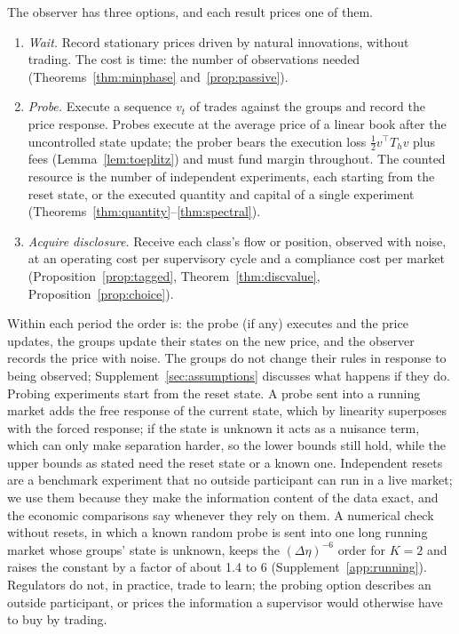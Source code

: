 \documentclass[12pt]{article}
\theoremstyle{definition}
\theoremstyle{remark}
\begin{document}
The observer has three options, and each result prices one of them.
\begin{enumerate}[label=(\alph*),itemsep=1pt]
\item \emph{Wait.} Record stationary prices driven by natural innovations, without trading. The cost is time: the number of observations needed (Theorems~\ref{thm:minphase} and~\ref{prop:passive}).
\item \emph{Probe.} Execute a sequence $v_t$ of trades against the groups and record the price response. Probes execute at the average price of a linear book after the uncontrolled state update; the prober bears the execution loss $\tfrac12v^\top T_hv$ plus fees (Lemma~\ref{lem:toeplitz}) and must fund margin throughout. The counted resource is the number of independent experiments, each starting from the reset state, or the executed quantity and capital of a single experiment (Theorems~\ref{thm:quantity}--\ref{thm:spectral}).
\item \emph{Acquire disclosure.} Receive each class's flow or position, observed with noise, at an operating cost per supervisory cycle and a compliance cost per market (Proposition~\ref{prop:tagged}, Theorem~\ref{thm:discvalue}, Proposition~\ref{prop:choice}).
\end{enumerate}
Within each period the order is: the probe (if any) executes and the price updates, the groups update their states on the new price, and the observer records the price with noise. The groups do not change their rules in response to being observed; Supplement~\ref{sec:assumptions} discusses what happens if they do. Probing experiments start from the reset state. A probe sent into a running market adds the free response of the current state, which by linearity superposes with the forced response; if the state is unknown it acts as a nuisance term, which can only make separation harder, so the lower bounds still hold, while the upper bounds as stated need the reset state or a known one. Independent resets are a benchmark experiment that no outside participant can run in a live market; we use them because they make the information content of the data exact, and the economic comparisons say whenever they rely on them. A numerical check without resets, in which a known random probe is sent into one long running market whose groups' state is unknown, keeps the $(\Delta\eta)^{-6}$ order for $K=2$ and raises the constant by a factor of about 1.4 to 6 (Supplement~\ref{app:running}). Regulators do not, in practice, trade to learn; the probing option describes an outside participant, or prices the information a supervisor would otherwise have to buy by trading.
\end{document}
